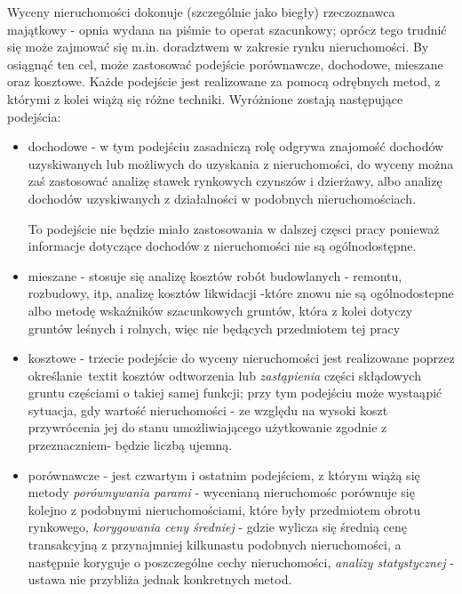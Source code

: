 \documentclass[a4paper,12pt,twoside,openany]{report}
\begin{document}
Wyceny nieruchomości dokonuje (szczególnie jako biegły) rzeczoznawca majątkowy - opnia wydana na piśmie to operat szacunkowy\cite{Operat}; oprócz tego trudnić się może zajmować się m.in. doradztwem w zakresie rynku nieruchomości\cite{Operat2}. By osiągnąć ten cel, może zastosować podejście porównawcze, dochodowe, mieszane oraz kosztowe. Każde podejście jest realizowane za pomocą odrębnych metod, z którymi z kolei wiążą się różne techniki.
Wyróżnione zostają następujące podejścia:
\begin{itemize}

\item dochodowe - w tym podejściu zasadniczą rolę odgrywa znajomość dochodów uzyskiwanych lub możliwych do uzyskania z nieruchomości, do wyceny można zaś zastosować analizę stawek rynkowych czynszów i dzierżawy, albo analizę dochodów uzyskiwanych z działalności w podobnych nieruchomościach.

To podejście nie będzie miało zastosowania w dalszej częsci pracy ponieważ informacje dotyczące dochodów z nieruchomości nie są ogólnodostępne.


\item mieszane - stosuje się analizę kosztów robót budowlanych - remontu, rozbudowy, itp, analizę kosztów likwidacji  -które znowu nie są ogólnodostepne albo metodę wskaźników szacunkowych gruntów, która z kolei dotyczy gruntów leśnych i rolnych, więc nie będących przedmiotem tej pracy


\item kosztowe - trzecie podejście do wyceny nieruchomości jest realizowane poprzez określanie\ textit{ kosztów odtworzenia} lub \textit {zastąpienia}  części skłądowych gruntu częściami o takiej samej funkcji; przy tym podejściu może wystaąpić sytuacja, gdy wartość nieruchomości - ze względu na wysoki koszt przywrócenia jej do stanu umożliwiającego użytkowanie zgodnie z przeznaczniem- będzie liczbą ujemną.

\item porównawcze - jest czwartym i ostatnim podejściem, z którym wiążą się metody \textit{porównywania parami} - wycenianą nieruchomośc porównuje się kolejno z podobnymi nieruchomościami, które były przedmiotem obrotu rynkowego, \textit{korygowania ceny średniej} - gdzie wylicza się średnią cenę transakcyjną z przynajmniej kilkunastu podobnych nieruchomości, a następnie koryguje o poszczególne cechy nieruchomości, \textit {analizy statystycznej} - ustawa nie przybliża jednak konkretnych metod.

\end{itemize}
\end{document}
